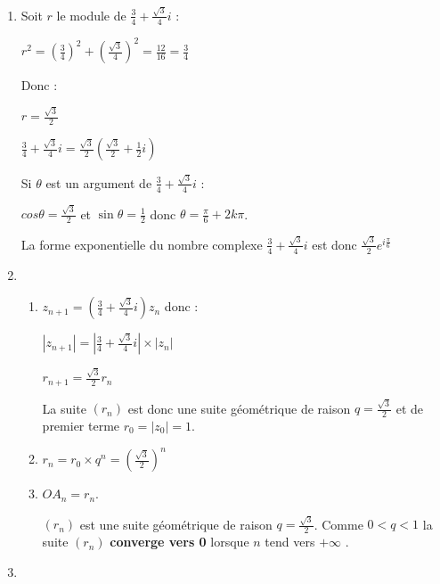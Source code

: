 \begin{corrige}
     \begin{enumerate}
          \item
          Soit $r$ le module de $\frac{3}{4}+\frac{\sqrt{3}}{4}i$ :
          \par
          $r^2=\left(\frac{3}{4}\right)^2+\left(\frac{\sqrt{3}}{4}\right)^2=\frac{12}{16}=\frac{3}{4}$
          \par
          Donc :
          \par
          $r=\frac{\sqrt{3}}{2}$
          \par
          $\frac{3}{4}+\frac{\sqrt{3}}{4}i=\frac{\sqrt{3}}{2}\left(\frac{\sqrt{3}}{2}+\frac{1}{2}i\right)$
          \par
          Si $\theta $ est un argument de  $\frac{3}{4}+\frac{\sqrt{3}}{4}i$ :
          \par
          $cos \theta  = \frac{\sqrt{3}}{2}$ et $\sin \theta  = \frac{1}{2}$ donc $\theta  = \frac{\pi }{6} + 2k\pi $.
          \par
          La forme exponentielle du nombre complexe $\frac{3}{4}+\frac{\sqrt{3}}{4}i$ est donc $\frac{\sqrt{3}}{2}e^{i\frac{\pi }{6}}$
          \item
          \begin{enumerate}[label=\alph*.]
               \item
               $ z_{n+1}=\left(\frac{3}{4}+\frac{\sqrt{3}}{4}i\right)z_{n}$ donc :
               \par
               $ |z_{n+1}|=\left|\frac{3}{4}+\frac{\sqrt{3}}{4}i\right|\times \left|z_{n}\right|$
               \par
               $r_{n+1}=\frac{\sqrt{3}}{2}r_{n}$
               \par
               La suite $\left(r_{n}\right)$ est donc une suite géométrique de raison $q=\frac{\sqrt{3}}{2}$ et de premier terme $r_{0}=|z_{0}|=1$.
               \item
               $r_{n}=r_{0}\times q^{n}=\left(\frac{\sqrt{3}}{2}\right)^{n}$
               \item
               $OA_{n}=r_{n}$.
               \par
               $\left(r_{n}\right)$ est une suite géométrique de raison $q=\frac{\sqrt{3}}{2}$. Comme $0 < q < 1$ la suite $\left(r_{n}\right)$ \textbf{converge vers 0} lorsque $n$ tend vers $+ \infty $ .
          \end{enumerate}
          \item
          \begin{enumerate}

\end{enumerate}
\end{enumerate}
\end{corrige}
